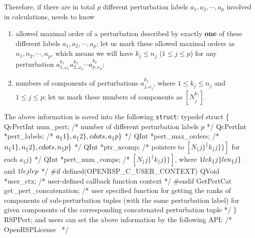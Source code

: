 Therefore, if there are in total $p$ different perturbation labels
$a_{1},a_{2},\cdots,a_{p}$ involved in calculations, \LibName needs to know
\begin{enumerate}
  \item allowed maximal order of a perturbation described by exactly
    \textbf{one} of these different labels $a_{1},a_{2},\cdots,a_{p}$; let
    us mark these allowed maximal orders as $n_{1},n_{2},\cdots,n_{p}$, which
    means we will have $k_{j}\le n_{j}$ ($1\le j\le p$) for any perturbation
    $a_{1,\omega_{1}}^{k_{1}}a_{2,\omega_{2}}^{k_{2}}\cdots a_{p,\omega_{p}}^{k_{p}}$;
  \item numbers of components of perturbations $a_{j,\omega_{j}}^{k_{j}}$,
    where $1\le k_{j}\le n_{j}$ and $1\le j\le p$; let us mark these numbers
    of components as $[N_{j}^{k_{j}}]$.
\end{enumerate}
The above information is saved into the following {\tt{}struct}:
\nwenddocs{}\endmoddef
typedef struct \{
    QcPertInt num_pert;                 /* number of different perturbation labels $p$ */
    QcPertInt *pert_labels;             /* $a_\{1\},a_\{2\},\\cdots,a_\{p\}$ */
    QInt *pert_max_orders;              /* $n_\{1\},n_\{2\},\\cdots,n_\{p\}$ */
    QInt *ptr_ncomp;                    /* pointers to $[N_\{j\}^\{k_\{j\}\}]$
                                           for each $a_\{j\}$ */
    QInt *pert_num_comps;               /* $[N_\{j\}^\{k_\{j\}\}]$, where
                                           $1\\le k_\{j\}\\le n_\{j\}$ and $1\\le j\\le p$ */
#if defined(OPENRSP_C_USER_CONTEXT)     
    QVoid *user_ctx;                    /* user-defined callback function context */
#endif
    GetPertCat get_pert_concatenation;  /* user specified function for getting
                                           the ranks of components of sub-perturbation
                                           tuples (with the same perturbation label)
                                           for given components of the corresponding
                                           concatenated perturbation tuple */
\} RSPPert;
\nwendcode{}and users can set the above information by the following API:
\nwenddocs{}\endmoddef
/*
  \LA{}OpenRSPLicense~{\nwtagstyle{}}\RA{}
*/

